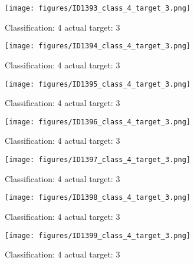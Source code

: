 \begin{figure}[h!]
\begin{center}
\texttt{[image: figures/ID1393\_class\_4\_target\_3.png]}
\end{center}
\caption{ Classification: 4 actual target: 3}
\label{fig:ID1393_class_4_target_3}
\end{figure}
\begin{figure}[h!]
\begin{center}
\texttt{[image: figures/ID1394\_class\_4\_target\_3.png]}
\end{center}
\caption{ Classification: 4 actual target: 3}
\label{fig:ID1394_class_4_target_3}
\end{figure}
\begin{figure}[h!]
\begin{center}
\texttt{[image: figures/ID1395\_class\_4\_target\_3.png]}
\end{center}
\caption{ Classification: 4 actual target: 3}
\label{fig:ID1395_class_4_target_3}
\end{figure}
\begin{figure}[h!]
\begin{center}
\texttt{[image: figures/ID1396\_class\_4\_target\_3.png]}
\end{center}
\caption{ Classification: 4 actual target: 3}
\label{fig:ID1396_class_4_target_3}
\end{figure}
\begin{figure}[h!]
\begin{center}
\texttt{[image: figures/ID1397\_class\_4\_target\_3.png]}
\end{center}
\caption{ Classification: 4 actual target: 3}
\label{fig:ID1397_class_4_target_3}
\end{figure}
\begin{figure}[h!]
\begin{center}
\texttt{[image: figures/ID1398\_class\_4\_target\_3.png]}
\end{center}
\caption{ Classification: 4 actual target: 3}
\label{fig:ID1398_class_4_target_3}
\end{figure}
\begin{figure}[h!]
\begin{center}
\texttt{[image: figures/ID1399\_class\_4\_target\_3.png]}
\end{center}
\caption{ Classification: 4 actual target: 3}
\label{fig:ID1399_class_4_target_3}
\end{figure}
